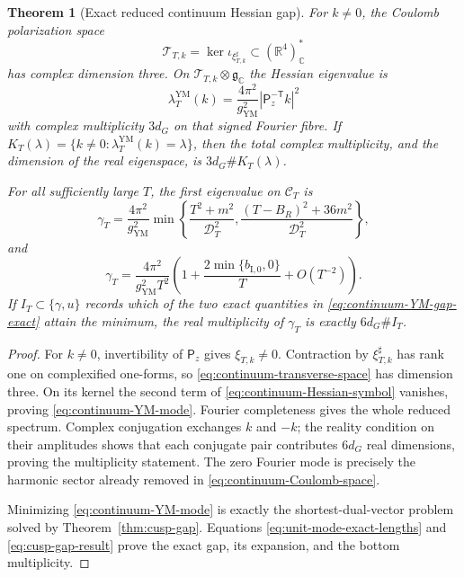 \documentclass[11pt]{article}
\numberwithin{equation}{section}
\newtheorem{theorem}{Theorem}[section]
\theoremstyle{definition}
\theoremstyle{remark}
\newcommand{\R}{\mathbb R}
\newcommand{\C}{\mathbb C}
\begin{document}
\begin{theorem}[Exact reduced continuum Hessian gap]
\label{thm:continuum-YM-gap}
For $k\ne0$, the Coulomb polarization space
\begin{equation}\label{eq:continuum-transverse-space}
 \mathcal T_{T,k}=\ker\iota_{\xi_{T,k}^\sharp}
 \subset(\R^4)^*_{\C}
\end{equation}
has complex dimension three.  On
$\mathcal T_{T,k}\otimes\mathfrak g_{\C}$ the Hessian eigenvalue is
\begin{equation}\label{eq:continuum-YM-mode}
 \lambda_T^{\mathrm{YM}}(k)
 =\frac{4\pi^2}{g_{\mathrm{YM}}^2}
 |\mathsf P_z^{-\mathsf T}k|^2
\end{equation}
with complex multiplicity $3d_G$ on that signed Fourier fibre.  If
$K_T(\lambda)=\{k\ne0:\lambda_T^{\mathrm{YM}}(k)=\lambda\}$, then the
total complex multiplicity, and the dimension of the real eigenspace, is
$3d_G\#K_T(\lambda)$.

For all sufficiently large $T$, the first eigenvalue on $\mathscr C_T$ is
\begin{equation}\label{eq:continuum-YM-gap-exact}
 \gamma_T=\frac{4\pi^2}{g_{\mathrm{YM}}^2}
 \min\left\{
 \frac{T^2+m^2}{\mathcal D_T^2},
 \frac{(T-B_R)^2+36m^2}{\mathcal D_T^2}
 \right\},
\end{equation}
and
\begin{equation}\label{eq:continuum-YM-gap-expansion}
 \boxed{\gamma_T=
 \frac{4\pi^2}{g_{\mathrm{YM}}^2T^2}
 \left(1+\frac{2\min\{b_{\mathrm I,0},0\}}T+O(T^{-2})\right).}
\end{equation}
If $I_T\subset\{\gamma,u\}$ records which of the two exact quantities in
\eqref{eq:continuum-YM-gap-exact} attain the minimum, the real multiplicity
of $\gamma_T$ is exactly $6d_G\#I_T$.
\end{theorem}

\begin{proof}
For $k\ne0$, invertibility of $\mathsf P_z$ gives $\xi_{T,k}\ne0$.
Contraction by $\xi_{T,k}^\sharp$ has rank one on complexified one-forms,
so \eqref{eq:continuum-transverse-space} has dimension three.  On its kernel
the second term of \eqref{eq:continuum-Hessian-symbol} vanishes, proving
\eqref{eq:continuum-YM-mode}.  Fourier completeness gives the whole reduced
spectrum.  Complex conjugation exchanges $k$ and $-k$; the reality condition
on their amplitudes shows that each conjugate pair contributes $6d_G$ real
dimensions, proving the multiplicity statement.  The zero Fourier mode is
precisely the harmonic sector already removed in
\eqref{eq:continuum-Coulomb-space}.

Minimizing \eqref{eq:continuum-YM-mode} is exactly the shortest-dual-vector
problem solved by Theorem~\ref{thm:cusp-gap}.  Equations
\eqref{eq:unit-mode-exact-lengths} and \eqref{eq:cusp-gap-result} prove the
exact gap, its expansion, and the bottom multiplicity.
\end{proof}
\end{document}
